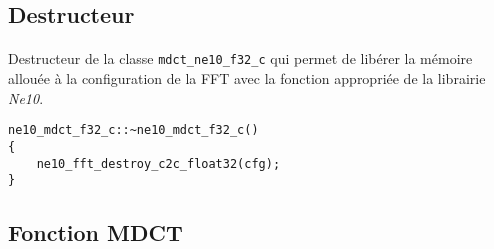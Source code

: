 \documentclass{article}
\begin{document}
\subsection{Destructeur}\label{app:mdct_ne10_f32_destructor}
\paragraph{}
Destructeur de la classe \texttt{mdct\_ne10\_f32\_c} qui permet de libérer la mémoire allouée à la configuration de la FFT avec la fonction appropriée de la librairie \emph{Ne10}.
\lstset{language=C++}
\begin{lstlisting}
ne10_mdct_f32_c::~ne10_mdct_f32_c()
{
    ne10_fft_destroy_c2c_float32(cfg);
}
\end{lstlisting}

\subsection{Fonction MDCT}\label{app:mdct_ne10_f32_func}
\end{document}
